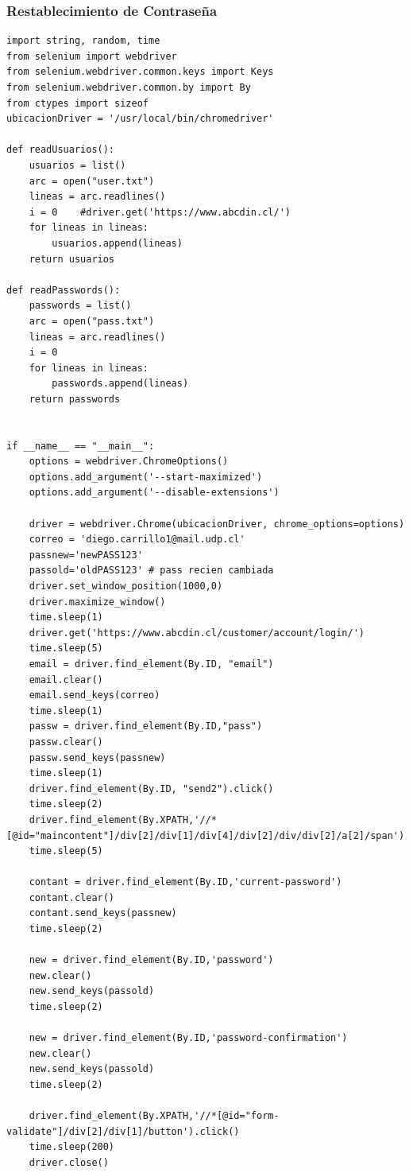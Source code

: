 \documentclass{article}
\begin{document}
\subsubsection{Restablecimiento de Contraseña}      
    \begin{lstlisting}[lenguaje=py]
import string, random, time
from selenium import webdriver
from selenium.webdriver.common.keys import Keys
from selenium.webdriver.common.by import By
from ctypes import sizeof
ubicacionDriver = '/usr/local/bin/chromedriver'

def readUsuarios():
    usuarios = list()
    arc = open("user.txt")
    lineas = arc.readlines()
    i = 0    #driver.get('https://www.abcdin.cl/')
    for lineas in lineas:
        usuarios.append(lineas)
    return usuarios

def readPasswords():
    passwords = list()
    arc = open("pass.txt")
    lineas = arc.readlines()
    i = 0
    for lineas in lineas:
        passwords.append(lineas)
    return passwords


if __name__ == "__main__":
    options = webdriver.ChromeOptions()
    options.add_argument('--start-maximized')
    options.add_argument('--disable-extensions')

    driver = webdriver.Chrome(ubicacionDriver, chrome_options=options)
    correo = 'diego.carrillo1@mail.udp.cl'
    passnew='newPASS123'
    passold='oldPASS123' # pass recien cambiada
    driver.set_window_position(1000,0)
    driver.maximize_window()
    time.sleep(1)
    driver.get('https://www.abcdin.cl/customer/account/login/')
    time.sleep(5)
    email = driver.find_element(By.ID, "email")
    email.clear()
    email.send_keys(correo)
    time.sleep(1)
    passw = driver.find_element(By.ID,"pass")
    passw.clear()
    passw.send_keys(passnew)
    time.sleep(1)
    driver.find_element(By.ID, "send2").click()
    time.sleep(2)
    driver.find_element(By.XPATH,'//*[@id="maincontent"]/div[2]/div[1]/div[4]/div[2]/div/div[2]/a[2]/span').click()
    time.sleep(5)
    
    contant = driver.find_element(By.ID,'current-password')
    contant.clear()
    contant.send_keys(passnew)
    time.sleep(2)

    new = driver.find_element(By.ID,'password')
    new.clear()
    new.send_keys(passold)
    time.sleep(2)

    new = driver.find_element(By.ID,'password-confirmation')
    new.clear()
    new.send_keys(passold)
    time.sleep(2)

    driver.find_element(By.XPATH,'//*[@id="form-validate"]/div[2]/div[1]/button').click()
    time.sleep(200)
    driver.close()
    \end{lstlisting}
\end{document}
